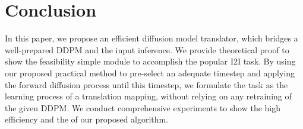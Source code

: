 \section{Conclusion}\label{sec:conclusion}


In this paper, we propose an efficient diffusion model translator, which bridges a well-prepared DDPM and the input inference.
%
We provide theoretical proof to show the feasibility   simple module to accomplish the popular I2I task.
%
By using our proposed practical method to pre-select an adequate timestep and applying the forward diffusion process until this timestep, we formulate the task as the learning process of a translation mapping, without relying on any retraining of the given DDPM.
%
We conduct comprehensive experiments to show the high efficiency and the  of our proposed algorithm.

